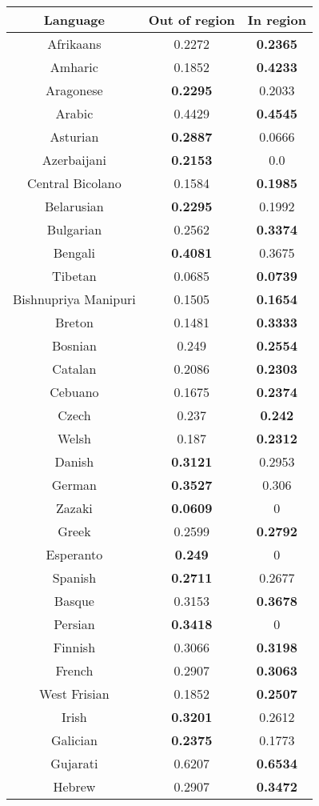 \begin{figure}[h]
\begin{tabular}{ccc}\hline\hline
Language&Out of region&In region\\
\hline
Afrikaans&0.2272&\textbf{0.2365}\\
Amharic&0.1852&\textbf{0.4233}\\
Aragonese&\textbf{0.2295}&0.2033\\
Arabic&0.4429&\textbf{0.4545}\\
Asturian&\textbf{0.2887}&0.0666\\
Azerbaijani&\textbf{0.2153}&0.0\\
Central Bicolano&0.1584&\textbf{0.1985}\\
Belarusian&\textbf{0.2295}&0.1992\\
Bulgarian&0.2562&\textbf{0.3374}\\
Bengali&\textbf{0.4081}&0.3675\\
Tibetan&0.0685&\textbf{0.0739}\\
Bishnupriya Manipuri&0.1505&\textbf{0.1654}\\
Breton&0.1481&\textbf{0.3333}\\
Bosnian&0.249&\textbf{0.2554}\\
Catalan&0.2086&\textbf{0.2303}\\
Cebuano&0.1675&\textbf{0.2374}\\
Czech&0.237&\textbf{0.242}\\
Welsh&0.187&\textbf{0.2312}\\
Danish&\textbf{0.3121}&0.2953\\
German&\textbf{0.3527}&0.306\\
Zazaki&\textbf{0.0609}&0\\
Greek&0.2599&\textbf{0.2792}\\
Esperanto&\textbf{0.249}&0\\
Spanish&\textbf{0.2711}&0.2677\\
Basque&0.3153&\textbf{0.3678}\\
Persian&\textbf{0.3418}&0\\
Finnish&0.3066&\textbf{0.3198}\\
French&0.2907&\textbf{0.3063}\\
West Frisian&0.1852&\textbf{0.2507}\\
Irish&\textbf{0.3201}&0.2612\\
Galician&\textbf{0.2375}&0.1773\\
Gujarati&0.6207&\textbf{0.6534}\\
Hebrew&0.2907&\textbf{0.3472}\\

\end{tabular}
\end{figure}
